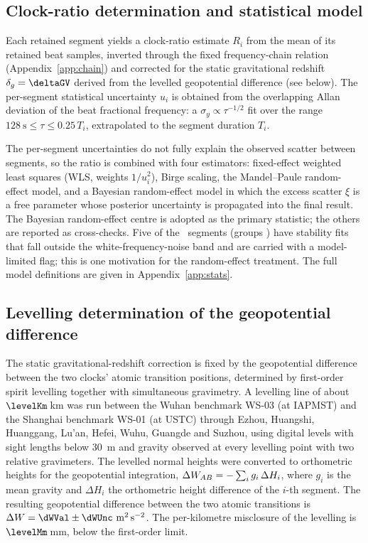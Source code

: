 \subsection*{Clock-ratio determination and statistical model}

Each retained segment yields a clock-ratio estimate $R_i$ from the mean
of its retained beat samples, inverted through the fixed frequency-chain
relation (Appendix~\ref{app:chain}) and corrected for the static
gravitational redshift $\delta_g = \deltaGV$ derived from the levelled
geopotential difference (see below). The
per-segment statistical uncertainty $u_i$ is obtained from the
overlapping Allan deviation of the beat fractional frequency: a
$\sigma_y \propto \tau^{-1/2}$ fit over the range
$128~\mathrm{s} \le \tau \le 0.25\,T_i$, extrapolated to the segment
duration $T_i$.

The per-segment uncertainties do not fully explain the observed scatter
between segments, so the ratio is combined with four estimators:
fixed-effect weighted least squares (WLS, weights $1/u_i^2$), Birge
scaling, the Mandel--Paule random-effect model, and a Bayesian
random-effect model in which the excess scatter $\xi$ is a free
parameter whose posterior uncertainty is propagated into the final
result. The Bayesian random-effect centre is adopted as the primary
statistic; the others are reported as cross-checks. Five of the
\nSeg~segments (groups \modelLimitedGroups) have stability fits that
fall outside the white-frequency-noise band and are carried with a
model-limited flag; this is one motivation for the random-effect
treatment. The full model definitions are given in
Appendix~\ref{app:stats}.

\subsection*{Levelling determination of the geopotential difference}

The static gravitational-redshift correction is fixed by the
geopotential difference between the two clocks' atomic transition
positions, determined by first-order spirit levelling together with
simultaneous gravimetry. A levelling line of about $\levelKm$\,km was
run between the Wuhan benchmark WS-03 (at IAPMST) and the Shanghai
benchmark WS-01 (at USTC) through Ezhou, Huangshi, Huanggang, Lu'an,
Hefei, Wuhu, Guangde and Suzhou, using digital levels with sight
lengths below \qty{30}{m} and gravity observed at every levelling point
with two relative gravimeters. The levelled normal heights were
converted to orthometric heights for the geopotential integration,
$\Delta W_{AB} = -\sum_i g_i\,\Delta H_i$, where $g_i$ is the mean gravity
and $\Delta H_i$ the orthometric height difference of the $i$-th
segment. The resulting geopotential difference between the two atomic
transitions is $\dW = \dWVal \pm \dWUnc~\mathrm{m^2\,s^{-2}}$. The
per-kilometre misclosure of the levelling is $\levelMm$\,mm, below the
first-order limit.

